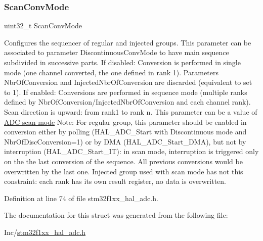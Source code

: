 \subsubsection{\texorpdfstring{Scan\+Conv\+Mode}{ScanConvMode}}
{\footnotesize\ttfamily uint32\+\_\+t Scan\+Conv\+Mode}

Configures the sequencer of regular and injected groups. This parameter can be associated to parameter \textquotesingle{}Discontinuous\+Conv\+Mode\textquotesingle{} to have main sequence subdivided in successive parts. If disabled\+: Conversion is performed in single mode (one channel converted, the one defined in rank 1). Parameters \textquotesingle{}Nbr\+Of\+Conversion\textquotesingle{} and \textquotesingle{}Injected\+Nbr\+Of\+Conversion\textquotesingle{} are discarded (equivalent to set to 1). If enabled\+: Conversions are performed in sequence mode (multiple ranks defined by \textquotesingle{}Nbr\+Of\+Conversion\textquotesingle{}/\textquotesingle{}Injected\+Nbr\+Of\+Conversion\textquotesingle{} and each channel rank). Scan direction is upward\+: from rank1 to rank \textquotesingle{}n\textquotesingle{}. This parameter can be a value of \hyperlink{group___a_d_c___scan__mode}{A\+DC scan mode} Note\+: For regular group, this parameter should be enabled in conversion either by polling (H\+A\+L\+\_\+\+A\+D\+C\+\_\+\+Start with Discontinuous mode and Nbr\+Of\+Disc\+Conversion=1) or by D\+MA (H\+A\+L\+\_\+\+A\+D\+C\+\_\+\+Start\+\_\+\+D\+MA), but not by interruption (H\+A\+L\+\_\+\+A\+D\+C\+\_\+\+Start\+\_\+\+IT)\+: in scan mode, interruption is triggered only on the the last conversion of the sequence. All previous conversions would be overwritten by the last one. Injected group used with scan mode has not this constraint\+: each rank has its own result register, no data is overwritten. 

Definition at line 74 of file stm32f1xx\+\_\+hal\+\_\+adc.\+h.



The documentation for this struct was generated from the following file\+:\begin{DoxyCompactItemize}
\item 
Inc/\hyperlink{stm32f1xx__hal__adc_8h}{stm32f1xx\+\_\+hal\+\_\+adc.\+h}\end{DoxyCompactItemize}
